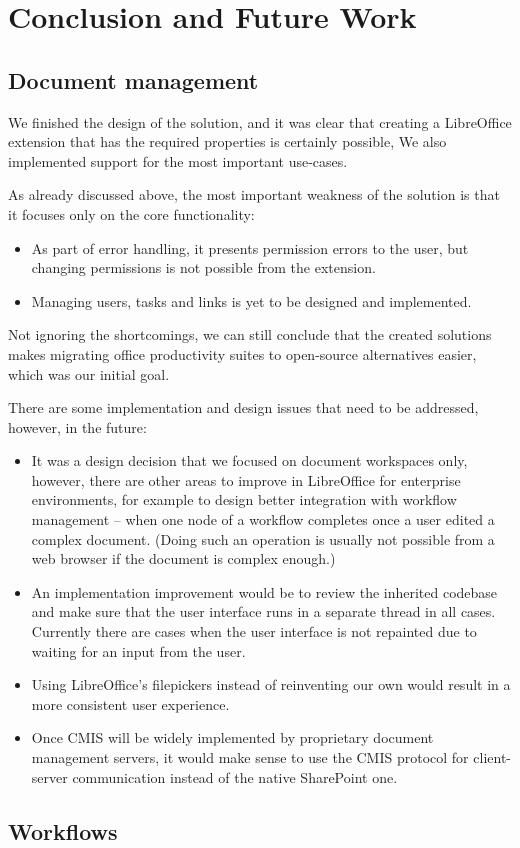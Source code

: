 \chapter{Conclusion and Future Work}

\section{Document management}

We finished the design of the solution, and it was clear that creating a
LibreOffice extension that has the required properties is certainly possible,
We also implemented support for the most important use-cases.

As already discussed above, the most important weakness of the solution is that
it focuses only on the core functionality:

\begin{itemize}
\item As part of error handling, it presents permission errors to the user, but
changing permissions is not possible from the extension.
\item Managing users, tasks and links is yet to be designed and implemented.
\end{itemize}

Not ignoring the shortcomings, we can still conclude that the created solutions
makes migrating office productivity suites to open-source alternatives easier,
which was our initial goal.

There are some implementation and design issues that need to be addressed,
however, in the future:

\begin{itemize}
\item It was a design decision that we focused on document workspaces only,
however, there are other areas to improve in LibreOffice for enterprise
environments, for example to design better integration with workflow management
-- when one node of a workflow completes once a user edited a complex document.
(Doing such an operation is usually not possible from a web browser if the
document is complex enough.)
\item An implementation improvement would be to review the inherited codebase
and make sure that the user interface runs in a separate thread in all cases.
Currently there are cases when the user interface is not repainted due to
waiting for an input from the user.
\item Using LibreOffice's filepickers instead of reinventing our own would
result in a more consistent user experience.
\item Once CMIS will be widely implemented by proprietary document management
servers, it would make sense to use the CMIS protocol for client-server
communication instead of the native SharePoint one.
\end{itemize}

\section{Workflows}
